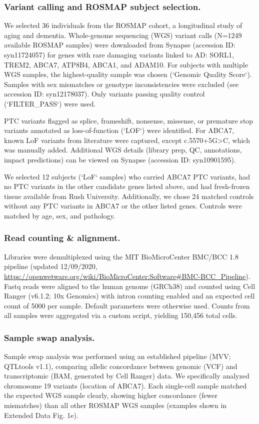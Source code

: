 \subsubsection{Variant calling and ROSMAP subject selection.}
We selected 36 individuals from the ROSMAP cohort, a longitudinal study of aging and dementia\supercite{Bennett2018-tn}. Whole-genome sequencing (WGS) variant calls (N=1249 available ROSMAP samples) were downloaded from Synapse (accession ID: syn11724057) for genes with rare damaging variants linked to AD: SORL1, TREM2, ABCA7, ATP8B4, ABCA1, and ADAM10\supercite{Holstege2022-vp}. For subjects with multiple WGS samples, the highest-quality sample was chosen (`Genomic Quality Score`). Samples with sex mismatches or genotype inconsistencies were excluded (see accession ID: syn12178037). Only variants passing quality control (`FILTER\_PASS`) were used.

PTC variants flagged as splice, frameshift, nonsense, missense, or premature stop variants annotated as loss-of-function (`LOF`) were identified. For ABCA7, known LoF variants from literature were captured, except c.5570+5G>C, which was manually added. Additional WGS details (library prep, QC, annotations, impact predictions) can be viewed on Synapse (accession ID: syn10901595). 

We selected 12 subjects (`LoF` samples) who carried ABCA7 PTC variants, had no PTC variants in the other candidate genes listed above, and had fresh-frozen tissue available from Rush University. Additionally, we chose 24 matched controls without any PTC variants in ABCA7 or the other listed genes. Controls were matched by age, sex, and pathology.

\subsubsection{Read counting & alignment.}
Libraries were demultiplexed using the MIT BioMicroCenter BMC/BCC 1.8 pipeline (updated 12/09/2020, \url{https://openwetware.org/wiki/BioMicroCenter:Software#BMC-BCC_Pipeline}). Fastq reads were aligned to the human genome (GRCh38) and counted using Cell Ranger (v6.1.2; 10x Genomics) with intron counting enabled and an expected cell count of 5000 per sample. Default parameters were otherwise used. Counts from all samples were aggregated via a custom script, yielding 150,456 total cells.

\subsubsection{Sample swap analysis.}
Sample swap analysis was performed using an established pipeline (MVV; QTLtools v1.1)\supercite{Fort2017-jq}, comparing allelic concordance between genomic (VCF) and transcriptomic (BAM, generated by Cell Ranger) data. We specifically analyzed chromosome 19 variants (location of ABCA7). Each single-cell sample matched the expected WGS sample clearly, showing higher concordance (fewer mismatches) than all other ROSMAP WGS samples (examples shown in Extended Data Fig. 1e).

